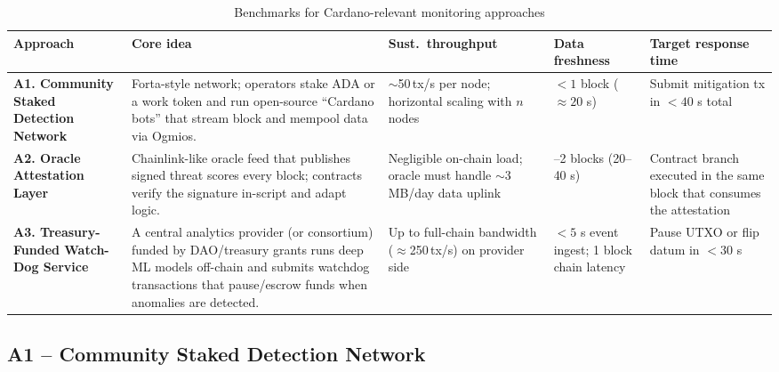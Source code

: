\documentclass{scrreport}
\begin{document}
\begin{table}[H]
\centering
\caption{Benchmarks for Cardano-relevant monitoring approaches}
\begin{tabularx}{\textwidth}{>{\raggedright\arraybackslash}p{3.2cm}%
                          >{\raggedright\arraybackslash}X%
                          >{\raggedright\arraybackslash}p{2cm}%
                          >{\raggedright\arraybackslash}p{2.2cm}%
                          >{\raggedright\arraybackslash}p{2.3cm}}
\toprule
Approach & Core idea & Sust.\ throughput\footnotemark & Data freshness & Target response time \\ \midrule
\textbf{A1. Community \mbox{Staked} Detection Network} &
  Forta-style network; operators stake ADA or a work token and run open-source “Cardano
  bots” that stream block and mempool data via Ogmios. &
  $\sim$50\,tx/s per node;
  horizontal scaling with $n$ nodes &
  $< 1$ block ($\approx 20$ s) &
  Submit mitigation tx in
  $< 40$ s total \\ \addlinespace[0.3em]

\textbf{A2. Oracle Attestation Layer} &
  Chainlink-like oracle feed that publishes signed threat scores
  every block; contracts
  verify the signature in-script and adapt logic. &
  Negligible on-chain load;
  oracle must handle $\sim$3\,MB/day data uplink &
  1–2 blocks
  (20–40 s) &
  Contract branch executed in the same block that consumes
  the attestation \\ \addlinespace[0.3em]

\textbf{A3. Treasury-Funded \mbox{Watch-Dog} Service} &
  A central analytics provider (or consortium) funded by DAO/treasury
  grants runs deep ML models off-chain and submits watchdog transactions
  that pause/escrow funds when anomalies are detected. &
  Up to full-chain bandwidth
  ($\approx$250\,tx/s) on provider side &
  $<\!5$ s event ingest;
  1 block chain latency &
  Pause UTXO or flip datum
  in $< 30$ s \\ \bottomrule
\end{tabularx}
\end{table}


\subsection{A1 – Community Staked Detection Network}
\end{document}
